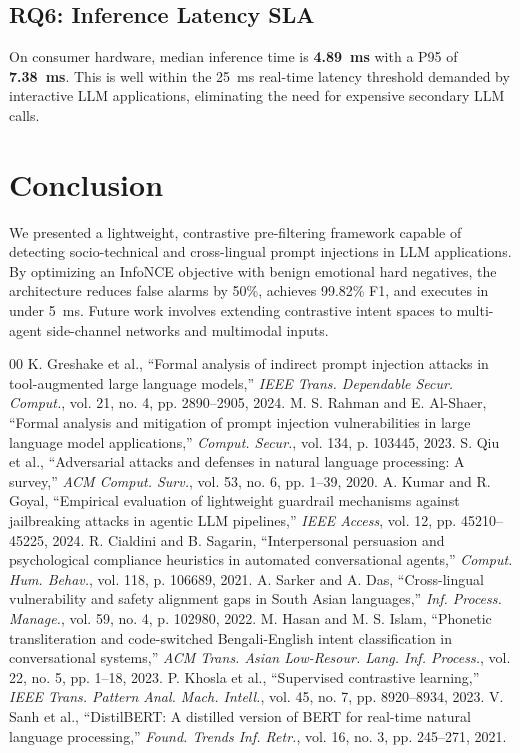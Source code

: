 \documentclass[conference]{IEEEtran}
\begin{document}
\subsection{RQ6: Inference Latency SLA}
On consumer hardware, median inference time is \textbf{4.89~ms} with a P95 of \textbf{7.38~ms}. This is well within the 25~ms real-time latency threshold demanded by interactive LLM applications, eliminating the need for expensive secondary LLM calls.

\section{Conclusion}
We presented a lightweight, contrastive pre-filtering framework capable of detecting socio-technical and cross-lingual prompt injections in LLM applications. By optimizing an InfoNCE objective with benign emotional hard negatives, the architecture reduces false alarms by 50\%, achieves 99.82\% F1, and executes in under 5~ms. Future work involves extending contrastive intent spaces to multi-agent side-channel networks and multimodal inputs.

\begin{thebibliography}{00}
 K. Greshake et al., ``Formal analysis of indirect prompt injection attacks in tool-augmented large language models,'' \textit{IEEE Trans. Dependable Secur. Comput.}, vol. 21, no. 4, pp. 2890--2905, 2024.
 M. S. Rahman and E. Al-Shaer, ``Formal analysis and mitigation of prompt injection vulnerabilities in large language model applications,'' \textit{Comput. Secur.}, vol. 134, p. 103445, 2023.
 S. Qiu et al., ``Adversarial attacks and defenses in natural language processing: A survey,'' \textit{ACM Comput. Surv.}, vol. 53, no. 6, pp. 1--39, 2020.
 A. Kumar and R. Goyal, ``Empirical evaluation of lightweight guardrail mechanisms against jailbreaking attacks in agentic LLM pipelines,'' \textit{IEEE Access}, vol. 12, pp. 45210--45225, 2024.
 R. Cialdini and B. Sagarin, ``Interpersonal persuasion and psychological compliance heuristics in automated conversational agents,'' \textit{Comput. Hum. Behav.}, vol. 118, p. 106689, 2021.
 A. Sarker and A. Das, ``Cross-lingual vulnerability and safety alignment gaps in South Asian languages,'' \textit{Inf. Process. Manage.}, vol. 59, no. 4, p. 102980, 2022.
 M. Hasan and M. S. Islam, ``Phonetic transliteration and code-switched Bengali-English intent classification in conversational systems,'' \textit{ACM Trans. Asian Low-Resour. Lang. Inf. Process.}, vol. 22, no. 5, pp. 1--18, 2023.
 P. Khosla et al., ``Supervised contrastive learning,'' \textit{IEEE Trans. Pattern Anal. Mach. Intell.}, vol. 45, no. 7, pp. 8920--8934, 2023.
 V. Sanh et al., ``DistilBERT: A distilled version of BERT for real-time natural language processing,'' \textit{Found. Trends Inf. Retr.}, vol. 16, no. 3, pp. 245--271, 2021.
\end{thebibliography}
\end{document}

